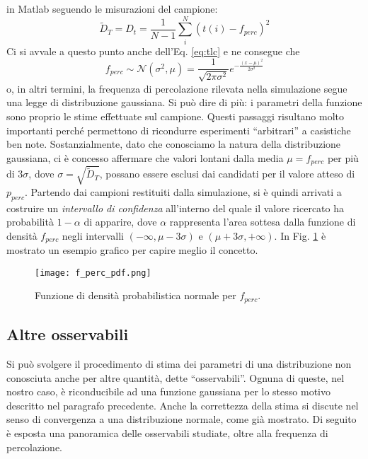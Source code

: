 in Matlab seguendo le misurazioni del campione:
\begin{equation}
    \tilde{D}_T = D_t = \frac{1}{N-1} \sum_{i}^{N} \left(t(i) - f_{perc}\right)^2
\end{equation}
Ci si avvale a questo punto anche dell'Eq. \ref{eq:tlc} e ne consegue che 
\begin{equation}
    f_{perc} \sim \mathcal{N}(\sigma^2, \mu) = \frac{1}{\sqrt{2\pi\sigma^2}} e^{-\frac{(x - \mu)^2}{2\sigma^2}}
\end{equation}
o, in altri termini, la frequenza di percolazione rilevata nella simulazione segue una legge 
di distribuzione gaussiana. 
Si può dire di più: i parametri della funzione sono proprio le stime effettuate sul campione.
Questi passaggi risultano molto importanti perché permettono di ricondurre
esperimenti ``arbitrari'' a casistiche ben note. Sostanzialmente, dato che conosciamo la natura
della distribuzione gaussiana, ci è concesso affermare che valori lontani 
dalla media $\mu=f_{perc}$ per più di $3\sigma$, dove $\sigma=\sqrt{\tilde{D}_T}$, possano essere esclusi
dai candidati per il valore atteso di $p_{perc}$. Partendo dai campioni restituiti dalla simulazione,
si è quindi arrivati a costruire un \textit{intervallo di confidenza} all'interno del quale il valore ricercato ha probabilità 
$1-\alpha$ di apparire, dove $\alpha$ rappresenta l'area sottesa dalla funzione di densità $f_{perc}$ negli intervalli $(-\infty, \mu - 3\sigma)$
e $(\mu + 3\sigma, +\infty)$.
In Fig. \ref{fig:f_perc_pdf} è mostrato un esempio grafico per capire meglio il concetto.
\begin{figure}[ht]
    \texttt{[image: f\_perc\_pdf.png]}
    \caption{Funzione di densità probabilistica normale per $f_{perc}$.}
    \label{fig:f_perc_pdf}
\end{figure}

\subsection*{Altre osservabili}
Si può svolgere il procedimento di stima dei parametri di una distribuzione non conosciuta anche per 
altre quantità, dette ``osservabili''. Ognuna di queste, nel nostro caso, è riconducibile ad una 
funzione gaussiana per lo stesso motivo descritto nel paragrafo precedente.
Anche la correttezza della stima si discute nel senso di convergenza a una distribuzione normale, come già mostrato.
Di seguito è esposta una panoramica delle osservabili studiate, oltre alla frequenza di percolazione.
